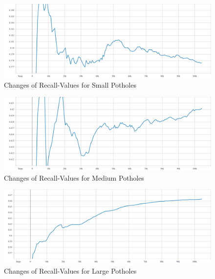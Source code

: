             \begin{figure}[h]
                \centering
                \includegraphics[width=\textwidth]{images/AR-small.pdf}
                \caption{Changes of Recall-Values for Small Potholes}
                \label{fig:recall_size_small}
            \end{figure}
            \begin{figure}[h]
                \centering
                \includegraphics[width=\textwidth]{images/AR-medium.pdf}
                \caption{Changes of Recall-Values for Medium Potholes}
                \label{fig:recall_size_medium}
            \end{figure}
            \begin{figure}
                \centering
                \includegraphics[width=\textwidth]{images/AR-large.pdf}
                \caption{Changes of Recall-Values for Large Potholes}
                \label{fig:recall_size_large}
            \end{figure}
            
